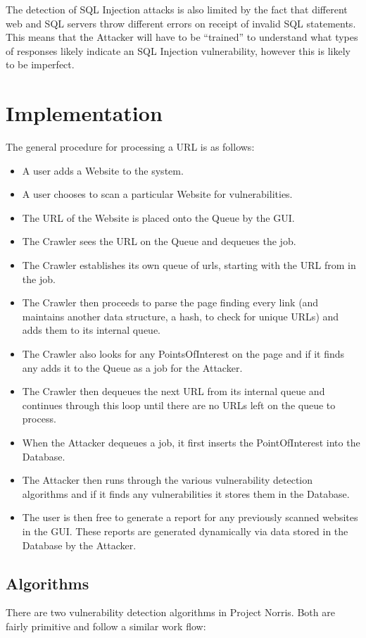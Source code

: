 \documentclass[12pt,a4paper]{article}
\begin{document}
The detection of SQL Injection attacks is also limited by the fact that different web and SQL servers throw different errors on receipt of invalid SQL statements.  This means that the Attacker will have to be “trained” to understand what types of responses likely indicate an SQL Injection vulnerability, however this is likely to be imperfect.

\section{Implementation}
The general procedure for processing a URL is as follows:

\begin{itemize}
    \item A user adds a Website to the system.
    \item A user chooses to scan a particular Website for vulnerabilities.
    \item The URL of the Website is placed onto the Queue by the GUI.
    \item The Crawler sees the URL on the Queue and dequeues the job.
    \item The Crawler establishes its own queue of urls, starting with the URL from in the job.
    \item The Crawler then proceeds to parse the page finding every link (and maintains another data structure, a hash, to check for unique URLs) and adds them to its internal queue.
    \item The Crawler also looks for any PointsOfInterest on the page and if it finds any adds it to the Queue as a job for the Attacker.
    \item The Crawler then dequeues the next URL from its internal queue and continues through this loop until there are no URLs left on the queue to process.
    \item When the Attacker dequeues a job, it first inserts the PointOfInterest into the Database.
    \item The Attacker then runs through the various vulnerability detection algorithms and if it finds any vulnerabilities it stores them in the Database.
    \item The user is then free to generate a report for any previously scanned websites in the GUI.  These reports are generated dynamically via data stored in the Database by the Attacker.
\end{itemize}

\subsection{Algorithms}
There are two vulnerability detection algorithms in Project Norris.  Both are fairly primitive and follow a similar work flow:
\end{document}
